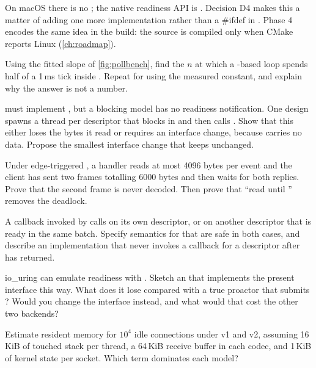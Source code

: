 On macOS there is no ; the native readiness API is . Decision D4 makes this a matter of adding one
more  implementation rather than a {\ttfamily\color{org}\#ifdef} in . Phase 4 encodes the same idea in the build:
the  source is compiled only when CMake reports Linux (\cref{ch:roadmap}).

\begin{exercises}
 Using the fitted slope of \cref{fig:pollbench}, find the $n$ at which a -based loop
spends half of a 1\,ms tick inside . Repeat for  using the measured constant, and explain why the
answer is not a number.

  must implement , but a blocking
model has no readiness notification. One design spawns a thread per descriptor that blocks in  and then calls
. Show that this either loses the bytes it read or requires an interface change, because  carries no
data. Propose the smallest interface change that keeps  unchanged.

 Under edge-triggered , a handler reads at most 4096 bytes per event and the client has sent
two frames totalling 6000 bytes and then waits for both replies. Prove that the second frame is never decoded. Then
prove that ``read until '' removes the deadlock.

 A callback invoked by  calls  on its own descriptor, or on another
descriptor that is ready in the same batch. Specify semantics for  that are safe in both cases, and
describe an implementation that never invokes a callback for a descriptor after  has returned.

 io\_uring can emulate readiness with . Sketch an
 that implements the present  interface this way. What does it lose compared with a
true proactor that submits ? Would you change the interface instead, and what would that cost the
other two backends?

 Estimate resident memory for $10^4$ idle connections under v1 and v2, assuming 16\,KiB of touched
stack per thread, a 64\,KiB receive buffer in each codec, and 1\,KiB of kernel state per socket. Which term dominates
each model?
\end{exercises}

